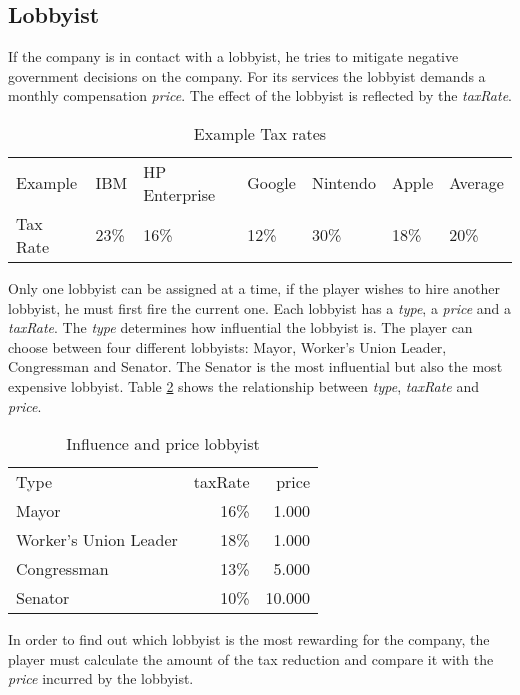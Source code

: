 \subsection{Lobbyist} \label{lobbyist_simulation}
If the company is in contact with a lobbyist, he tries to mitigate negative government decisions on the company. For its services the lobbyist demands a monthly compensation \textit{price}. The effect of the lobbyist is reflected by the \textit{taxRate}. 


\begin{table}[]
\centering
\begin{tabular}{|l|l|l|l|l|l|l|}
\hline
Example & IBM & HP Enterprise & Google & Nintendo & Apple & Average \\
Tax Rate & 23\% & 16\% & 12\% & 30\% & 18\% & 20\% \\ \hline
\end{tabular}
\caption{Example Tax rates}
\label{Example_Tax}
\end{table}

Only one lobbyist can be assigned at a time, if the player wishes to hire another lobbyist, he must first fire the current one. Each lobbyist has a \textit{type}, a \textit{price} and a \textit{taxRate}. The \textit{type} determines how influential the lobbyist is. The player can choose between four different lobbyists: Mayor, Worker’s Union Leader, Congressman and Senator. The Senator is the most influential but also the most expensive lobbyist. Table \ref{influence_lobbyist} shows the relationship between \textit{type}, \textit{taxRate} and \textit{price}. \\

\begin{table}[ht]
\centering
\begin{tabular}{|l|r|r|}
\hline
Type                    & taxRate   & price \\
Mayor                   & 16\%      & 1.000     \\
Worker's Union Leader   & 18\%      & 1.000     \\
Congressman             & 13\%      & 5.000     \\
Senator                 & 10\%      & 10.000     \\
\hline
\end{tabular}
\caption{Influence and price lobbyist}
\label{influence_lobbyist}
\end{table}

In order to find out which lobbyist is the most rewarding for the company, the player must calculate the amount of the tax reduction and compare it with the \textit{price} incurred by the lobbyist.
 



 




